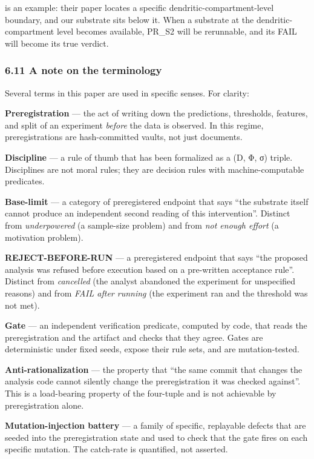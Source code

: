 \documentclass[
]{article}
\begin{document}
\citet{ref35} is an example: their paper locates a specific
dendritic-compartment-level boundary, and our substrate sits below it.
When a substrate at the dendritic-compartment level becomes available,
PR\_S2 will be rerunnable, and its FAIL will become its true verdict.

\subsubsection{6.11 A note on the
terminology}\label{a-note-on-the-terminology}

Several terms in this paper are used in specific senses. For clarity:

\textbf{Preregistration} --- the act of writing down the predictions,
thresholds, features, and split of an experiment \emph{before} the data
is observed. In this regime, preregistrations are hash-committed vaults,
not just documents.

\textbf{Discipline} --- a rule of thumb that has been formalized as a
(D, Φ, σ) triple. Disciplines are not moral rules; they are decision
rules with machine-computable predicates.

\textbf{Base-limit} --- a category of preregistered endpoint that says
``the substrate itself cannot produce an independent second reading of
this intervention''. Distinct from \emph{underpowered} (a sample-size
problem) and from \emph{not enough effort} (a motivation problem).

\textbf{REJECT-BEFORE-RUN} --- a preregistered endpoint that says ``the
proposed analysis was refused before execution based on a pre-written
acceptance rule''. Distinct from \emph{cancelled} (the analyst abandoned
the experiment for unspecified reasons) and from \emph{FAIL after
running} (the experiment ran and the threshold was not met).

\textbf{Gate} --- an independent verification predicate, computed by
code, that reads the preregistration and the artifact and checks that
they agree. Gates are deterministic under fixed seeds, expose their rule
sets, and are mutation-tested.

\textbf{Anti-rationalization} --- the property that ``the same commit
that changes the analysis code cannot silently change the
preregistration it was checked against''. This is a load-bearing
property of the four-tuple and is not achievable by preregistration
alone.

\textbf{Mutation-injection battery} --- a family of specific, replayable
defects that are seeded into the preregistration state and used to check
that the gate fires on each specific mutation. The catch-rate is
quantified, not asserted.
\end{document}
